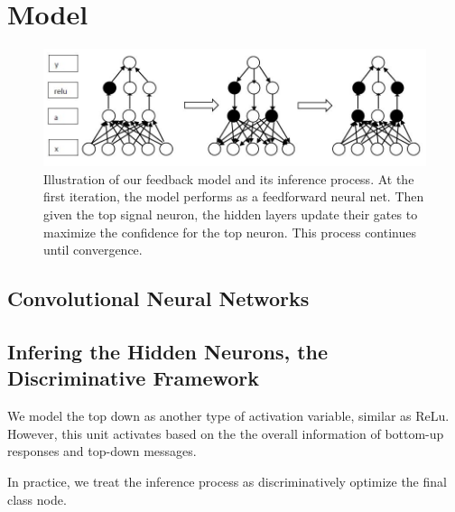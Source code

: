 \section{Model}
\label{sec:model}

\setlength{\tabcolsep}{2pt}
\begin{figure}
\begin{center}
\includegraphics[width=0.95\linewidth]{figs/model/iteration}
\caption{Illustration of our feedback model and its inference process. At the first iteration, the model performs as a feedforward neural net. Then given the top signal neuron, the hidden layers update their gates to maximize the confidence for the top neuron. This process continues until convergence.}
\label{fig:visual_compare}
\end{center}
\end{figure}

\subsection{Convolutional Neural Networks}

\subsection{Infering the Hidden Neurons, the Discriminative Framework}


We model the top down as another type of activation variable, similar as ReLu. However, this unit activates based on the the overall information of bottom-up responses and top-down messages. 

In practice, we treat the inference process as discriminatively optimize the final class node. 

